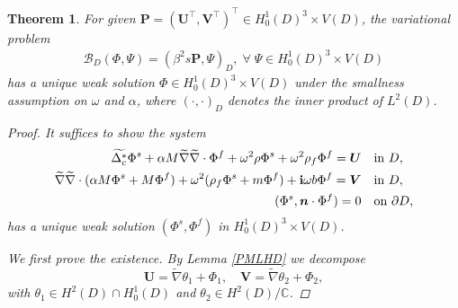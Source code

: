 \documentclass[11pt]{article}
\newcommand{\pa}{\partial}
\newcommand{\De}{\Delta}
\newcommand{\wid}{\widetilde}
\newcommand{\bs}{\boldsymbol}
\newtheorem{theorem}{Theorem}[section]
\begin{document}
\begin{theorem}\label{maintheorem}
For given $\bs{P}=(\bs{U}^{\top},\bs{V}^{\top})^{\top}\in H_0^1(D)^3\times V(D)$, the variational problem
\begin{equation}\label{mainweakequation}
\begin{aligned}
\mathcal{B}_{D}(\Phi,\Psi) =(\beta^2s\bs{P},\Psi )_D
,\;\forall\;\Psi \in H_0^1(D)^3\times V(D)
\end{aligned}
\end{equation}
has a unique weak solution $\Phi\in H_0^1(D)^3\times V(D)$ under the smallness assumption on $\omega$
 and $\alpha$, where $(\cdot,\cdot)_D$ denotes the inner product of $L^2(D)$.
\begin{proof} 
It suffices to show the system 
\begin{equation}\label{pmlporoelastic1}
\begin{aligned}
\wid{\De_c^*}\Phi^s+\alpha M \wid{\nabla}\wid{\nabla}\cdot\Phi^f+\omega^2\rho \Phi^s 
+\omega^2\rho_f \Phi^f= \bs{U}& \quad\text{in }  D,\\
\wid{\nabla}\wid{\nabla}\cdot(\alpha M\Phi^s+ M \Phi^f)
+ \omega^2(\rho_f \Phi^s+m \Phi^f)+{\bf i}\omega b \Phi^f= \bs{V}& \quad\text{in }  D,\\
(\Phi^s,\bs{n}\cdot\Phi^f)=0 & \quad\text{on } \pa D,
\end{aligned}
\end{equation}
has a unique weak solution $(\Phi^s,\Phi^f)$ in $H_0^1(D)^3\times V(D)$.

We first prove the existence. By Lemma \ref{PMLHD} we decompose
\begin{equation}\label{PMLHDsources}
\bs{U} = \wid{\nabla}\theta_1 + \Phi_1,\quad
\bs{V} = \wid{\nabla}\theta_2 + \Phi_2,
\end{equation}
with $\theta_1\in H^2(D)\cap H_0^1(D)$ and $\theta_2\in H^2(D)/\mathbb{C}$.


\end{proof}
\end{theorem}
\end{document}
